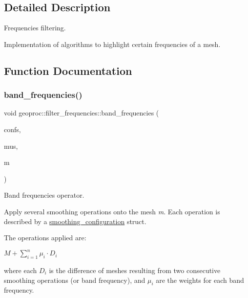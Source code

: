 \subsection{Detailed Description}
Frequencies filtering. 

Implementation of algorithms to highlight certain frequencies of a mesh. 

\subsection{Function Documentation}
\mbox{\label{namespacegeoproc_1_1filter__frequencies_aa795010d1cd2daaafb0b1f60ee3ab1cd}} 
\subsubsection{\texorpdfstring{band\+\_\+frequencies()}{band\_frequencies()}\hspace{0.1cm}{\footnotesize\ttfamily [1/2]}}
{\footnotesize\ttfamily void geoproc\+::filter\+\_\+frequencies\+::band\+\_\+frequencies (\begin{DoxyParamCaption}\item[{const std\+::vector$<$ \hyperlink{structgeoproc_1_1filter__frequencies_1_1smoothing__configuration}{smoothing\+\_\+configuration} $>$ \&}]{confs,  }\item[{const std\+::vector$<$ float $>$ \&}]{mus,  }\item[{\hyperlink{classgeoproc_1_1TriangleMesh}{Triangle\+Mesh} \&}]{m }\end{DoxyParamCaption})}



Band frequencies operator. 

Apply several smoothing operations onto the mesh {\itshape m}. Each operation is described by a \hyperlink{structgeoproc_1_1filter__frequencies_1_1smoothing__configuration}{smoothing\+\_\+configuration} struct.

The operations applied are\+:

$M + \sum_{i=1}^n \mu_i \cdot D_i$

where each $D_i$ is the difference of meshes resulting from two consecutive smoothing operations (or band frequency), and $\mu_i$ are the weights for each band frequency.

